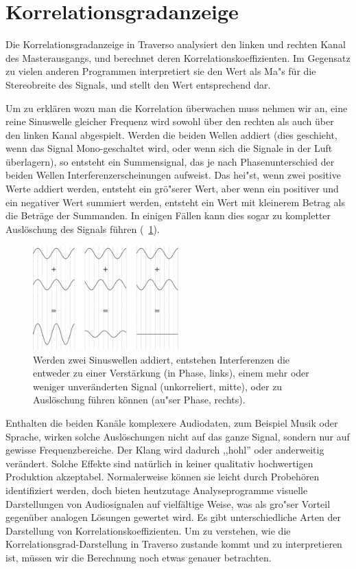 \section{Korrelationsgradanzeige}
Die Korrelationsgradanzeige in Traverso analysiert den linken und rechten Kanal des Masterausgangs, und berechnet deren Korrelationskoeffizienten. Im Gegensatz zu vielen anderen Programmen interpretiert sie den Wert als Ma"s für die Stereobreite des Signals, und stellt den Wert entsprechend dar.

Um zu erklären wozu man die Korrelation überwachen muss nehmen wir an, eine reine Sinuswelle gleicher Frequenz wird sowohl über den rechten als auch über den linken Kanal abgespielt. Werden die beiden Wellen addiert (dies geschieht, wenn das Signal Mono-geschaltet wird, oder wenn sich die Signale in der Luft überlagern), so entsteht ein Summensignal, das je nach Phasenunterschied der beiden Wellen Interferenzerscheinungen aufweist. Das hei"st, wenn zwei positive Werte addiert werden, entsteht ein grö"serer Wert, aber wenn ein positiver und ein negativer Wert summiert werden, entsteht ein Wert mit kleinerem Betrag als die Beträge der Summanden. In einigen Fällen kann dies sogar zu kompletter Auslöschung des Signals führen (\FigB\ \ref{fig_interference}).

\begin{figure}
	\centering\includegraphics[width=0.5\textwidth]{../images/sine01}
	\caption{Werden zwei Sinuswellen addiert, entstehen Interferenzen die entweder zu einer Verstärkung (in Phase, links), einem mehr oder weniger unveränderten Signal (unkorreliert, mitte), oder zu Auslöschung führen können (au"ser Phase, rechts).}
	\label{fig_interference}
\end{figure}

Enthalten die beiden Kanäle komplexere Audiodaten, zum Beispiel Musik oder Sprache, wirken solche Auslöschungen nicht auf das ganze Signal, sondern nur auf gewisse Frequenzbereiche. Der Klang wird dadurch ,,hohl'' oder anderweitig verändert. Solche Effekte sind natürlich in keiner qualitativ hochwertigen Produktion akzeptabel. Normalerweise können sie leicht durch Probehören identifiziert werden, doch bieten heutzutage Analyseprogramme visuelle Darstellungen von Audiosignalen auf vielfältige Weise, was als gro"ser Vorteil gegenüber analogen Lösungen gewertet wird. Es gibt unterschiedliche Arten der Darstellung von Korrelationskoeffizienten. Um zu verstehen, wie die Korrelationsgrad-Darstellung in Traverso zustande kommt und zu interpretieren ist, müssen wir die Berechnung noch etwas genauer betrachten.

